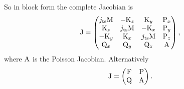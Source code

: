 So in block form the complete Jacobian is
\begin{equation}
  \mathrm{J} =
  \begin{pmatrix}
    j_\text{ts} \mathrm{M}    & -\mathrm{K}_z       & \mathrm{K}_y      & \mathrm{P}_x \\
    \mathrm{K}_z         & j_\text{ts}\mathrm{M}    & -\mathrm{K}_x     & \mathrm{P}_y \\
    -\mathrm{K}_y        & \mathrm{K}_x      & j_\text{ts} \mathrm{M} & \mathrm{P}_z \\
    \mathrm{Q}_x       & \mathrm{Q}_y      & \mathrm{Q}_z    & \mathrm{A}     \\
  \end{pmatrix},
\end{equation}
where $\mathrm{A}$ is the Poisson Jacobian.
Alternatively
\begin{equation}
\mathrm{J} =
  \begin{pmatrix}
    \mathrm{F}   & \mathrm{P} \\
    \mathrm{Q}   & \mathrm{A} \\
  \end{pmatrix}.
\end{equation}





